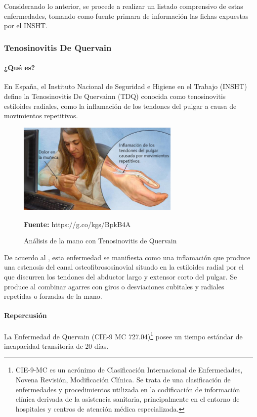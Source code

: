 Considerando lo anterior, se procede a realizar un listado comprensivo de estas enfermedades, tomando como fuente primara de información las fichas expuestas por el INSHT.

\subsubsection{Tenosinovitis De Quervain}
\paragraph{¿Qué es?}
En España, el Instituto Nacional de Seguridad e Higiene en el Trabajo (INSHT) define la Tenosinovitis De Quervainn (TDQ) conocida como tenosinovitis estiloides radiales, como la inflamación de los tendones del pulgar a causa de movimientos repetitivos. \parencite[1]{INSHT2017TendinitisPulgar}

\begin{figure}[H]
    \centering
    \includegraphics[width=0.7\textwidth]{Anexos/LATEX/chapters/images/TDQ.jpg}
    \caption{Análisis de la mano con Tenosinovitis de Quervain}
    \small{\textbf{Fuente:} https://g.co/kgs/BpkB4A}
    \label{TDQ}
\end{figure}

De acuerdo al \parencite[2]{INSHT2017TendinitisPulgar}, esta enfermedad se manifiesta como una inflamación que produce una estenosis del canal osteofibrososinovial situado en la estiloides radial por el que discurren los tendones del abductor largo y extensor corto del pulgar. Se produce al combinar agarres con giros o desviaciones cubitales y radiales repetidas o forzadas de la mano.
\paragraph{Repercusión}
La Enfermedad de Quervain (CIE-9 MC 727.04)\footnote{CIE-9-MC es un acrónimo de Clasificación Internacional de Enfermedades, Novena Revisión, Modificación Clínica. Se trata de una clasificación de enfermedades y procedimientos utilizada en la codificación de información clínica derivada de la asistencia sanitaria, principalmente en el entorno de hospitales y centros de atención médica especializada.} posee un tiempo estándar de incapacidad transitoria de 20 días.\parencite[6]{INSHT2017TendinitisPulgar}
